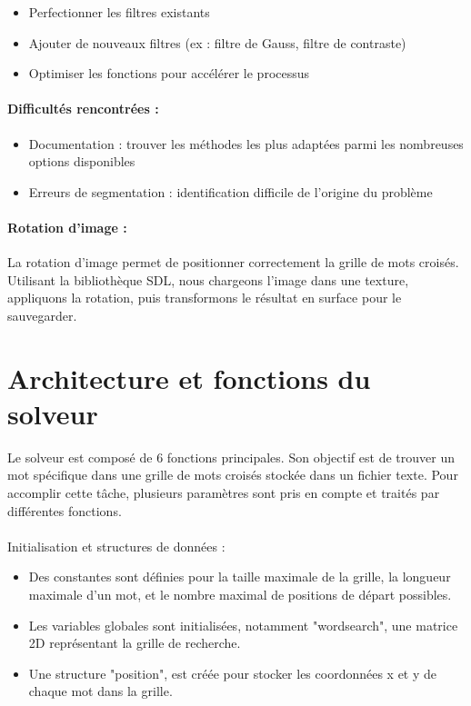 \begin{itemize}
  \item{Perfectionner les filtres existants}
  \item{Ajouter de nouveaux filtres (ex : filtre de Gauss, filtre de contraste)}
  \item{Optimiser les fonctions pour accélérer le processus}
\end{itemize}

\subsubsection{Difficultés rencontrées :}

\begin{itemize}
  \item{Documentation : trouver les méthodes les plus adaptées parmi les nombreuses options disponibles}
  \item{Erreurs de segmentation : identification difficile de l'origine du problème}
\end{itemize}

\subsubsection{Rotation d'image :}

La rotation d'image permet de positionner correctement la grille de mots croisés. Utilisant la bibliothèque SDL, nous chargeons l'image dans une texture, appliquons la rotation, puis transformons le résultat en surface pour le sauvegarder.

\chapter{Architecture et fonctions du solveur}

Le solveur est composé de 6 fonctions principales. Son objectif est de trouver un mot spécifique dans une grille de mots croisés stockée dans un fichier texte. Pour accomplir cette tâche, plusieurs paramètres sont pris en compte et traités par différentes fonctions.\\\\
Initialisation et structures de données :
\begin{itemize}
  \item{Des constantes sont définies pour la taille maximale de la grille, la longueur maximale d'un mot, et le nombre maximal de positions de départ possibles.}
  \item{Les variables globales sont initialisées, notamment "wordsearch", une matrice 2D représentant la grille de recherche.}
  \item{Une structure "position", est créée pour stocker les coordonnées x et y de chaque mot dans la grille.}
\end{itemize}

